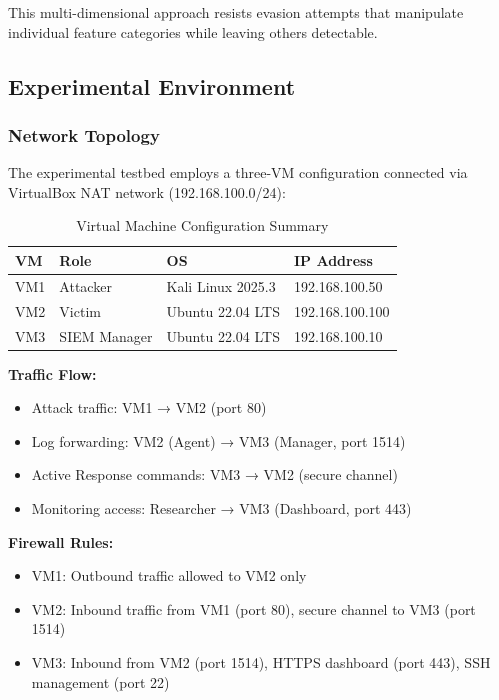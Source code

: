 This multi-dimensional approach resists evasion attempts that manipulate individual feature categories while leaving others detectable.

\subsection{Experimental Environment}

\subsubsection{Network Topology}

The experimental testbed employs a three-VM configuration connected via VirtualBox NAT network (192.168.100.0/24):

\begin{table}[h]
\centering
\caption{Virtual Machine Configuration Summary}
\label{tab:vm_config}
\begin{tabular}{llll}
\toprule
\textbf{VM} & \textbf{Role} & \textbf{OS} & \textbf{IP Address} \\
\midrule
VM1 & Attacker & Kali Linux 2025.3 & 192.168.100.50 \\
VM2 & Victim & Ubuntu 22.04 LTS & 192.168.100.100 \\
VM3 & SIEM Manager & Ubuntu 22.04 LTS & 192.168.100.10 \\
\bottomrule
\end{tabular}
\end{table}

\textbf{Traffic Flow:}
\begin{itemize}
    \item Attack traffic: VM1 → VM2 (port 80)
    \item Log forwarding: VM2 (Agent) → VM3 (Manager, port 1514)
    \item Active Response commands: VM3 → VM2 (secure channel)
    \item Monitoring access: Researcher → VM3 (Dashboard, port 443)
\end{itemize}

\textbf{Firewall Rules:}
\begin{itemize}
    \item VM1: Outbound traffic allowed to VM2 only
    \item VM2: Inbound traffic from VM1 (port 80), secure channel to VM3 (port 1514)
    \item VM3: Inbound from VM2 (port 1514), HTTPS dashboard (port 443), SSH management (port 22)
\end{itemize}

